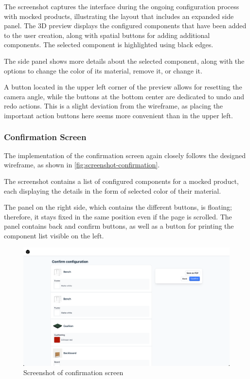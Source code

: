The screenshot captures the interface during the ongoing configuration process with mocked products, illustrating the layout that includes an expanded side panel. The 3D preview displays the configured components that have been added to the user creation, along with spatial buttons for adding additional components. The selected component is highlighted using black edges.

The side panel shows more details about the selected component, along with the options to change the color of its material, remove it, or change it.

A button located in the upper left corner of the preview allows for resetting the camera angle, while the buttons at the bottom center are dedicated to undo and redo actions. This is a slight deviation from the wireframe, as placing the important action buttons here seems more convenient than in the upper left.


\subsubsection{Confirmation Screen}

The implementation of the confirmation screen again closely follows the designed wireframe, as shown in \autoref{fig:screenshot-confirmation}.

The screenshot contains a list of configured components for a mocked product, each displaying the details in the form of selected color of their material.

The panel on the right side, which contains the different buttons, is floating; therefore, it stays fixed in the same position even if the page is scrolled. The panel contains back and confirm buttons, as well as a button for printing the component list visible on the left.

\begin{figure}[h]
\centering
\includegraphics[width=\textwidth]{images/screenshot_confirmation.png}
\caption{Screenshot of confirmation screen}
\label{fig:screenshot-confirmation}
\end{figure}



